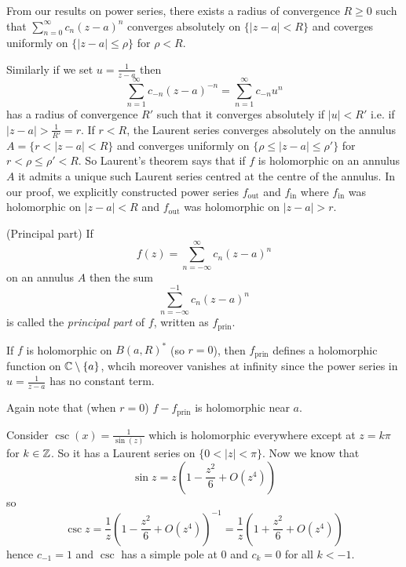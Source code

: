 \documentclass{article}
\begin{document}
From our results on power series, there exists a radius of convergence $ R\ge 0 $ such that $ \sum_{n=0}^\infty c_n(z-a)^n $ converges absolutely on $ \{|z-a|<R\} $ and coverges uniformly on $ \{|z-a|\le \rho\} $ for $ \rho < R $.\par
Similarly if we set $ u =\frac 1{z-a} $ then
\[
	\sum_{n=1}^\infty c_{-n}(z-a)^{-n} = \sum_{n=1}^\infty c_{-n} u^n
\]
has a radius of convergence $ R' $ such that it converges absolutely if $ |u| < R' $ i.e. if $ |z-a| > \frac 1{R'} = r $. If $ r< R $, the Laurent series converges absolutely on the annulus $ A = \{ r<|z-a|<R \} $ and converges uniformly on $ \{\rho\le |z-a|\le \rho '\} $ for $ r<\rho \le \rho'<R $. So Laurent's theorem says that if $ f $ is holomorphic on an annulus $ A $ it admits a unique such Laurent series centred at the centre of the annulus. In our proof, we explicitly constructed power series $ f_{\text{out}} $ and $ f_{\text{in}} $ where $ f_{\text{in}} $ was holomorphic on $ |z-a| < R $ and $ f_{\text{out}} $ was holomorphic on $ |z-a| > r $. 
\begin{definition}
	(Principal part) If
  \[
	  f(z) = \sum_{n=-\infty}^\infty c_n(z-a)^n
  \]
  on an annulus $ A $ then the sum
  \[
	  \sum_{n=-\infty}^{-1} c_n(z-a)^n
  \]
  is called the \textit{principal part} of $ f $, written as $ f_{\text{prin}} $.
\end{definition}
\begin{remark}
	If $ f $ is holomorphic on $ B(a,R)^* $ (so $ r=0 $), then $ f_{\text{prin}} $ defines a holomorphic function on $ \mathbb{C}\setminus \{a\} $, whcih moreover vanishes at infinity since the power series in $ u=\frac{1}{z-a} $ has no constant term.
\end{remark}
Again note that (when $ r=0 $) $ f-f_{\text{prin}} $ is holomorphic near $ a $.
\begin{example}
	Consider $ \csc(x) = \frac 1{\sin(z)} $ which is holomorphic everywhere except at $ z=k\pi $ for $ k\in \mathbb{Z} $. So it has a Laurent series on $ \{0<|z|< \pi\} $. Now we know that
	\[
		\sin z = z\left(1-\frac {z^2}6 + O(z^4)\right)
	\]
	so
	\[
		\csc z = \frac 1z \left(1-\frac {z^2}6 + O(z^4)\right)^{-1} = \frac 1z\left(1+ \frac {z^2}6 + O(z^4)\right)
	\]
	hence $ c_{-1} = 1 $ and $ \csc $ has a simple pole at $ 0 $ and $ c_k =0 $ for all $ k<-1 $.
\end{example}
\end{document}

